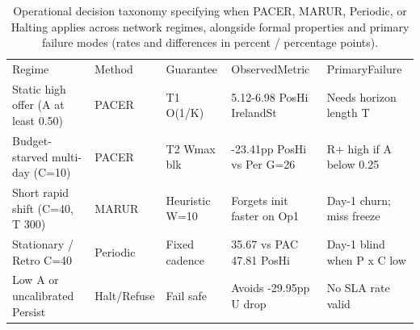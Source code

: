 \begin{table}[!ht]
\centering\footnotesize\setlength{\tabcolsep}{4pt}
\caption{Operational decision taxonomy specifying when PACER, MARUR, Periodic, or Halting applies across network regimes, alongside formal properties and primary failure modes (rates and differences in percent / percentage points).}
\begin{tabular}{lllll}
\hline
Regime & Method & Guarantee & ObservedMetric & PrimaryFailure \\
Static high offer (A at least 0.50) & PACER & T1 O(1/K) & 5.12-6.98 PosHi IrelandSt & Needs horizon length T \\
Budget-starved multi-day (C=10) & PACER & T2 Wmax blk & -23.41pp PosHi vs Per G=26 & R+ high if A below 0.25 \\
Short rapid shift (C=40, T 300) & MARUR & Heuristic W=10 & Forgets init faster on Op1 & Day-1 churn; miss freeze \\
Stationary / Retro C=40 & Periodic & Fixed cadence & 35.67 vs PAC 47.81 PosHi & Day-1 blind when P x C low \\
Low A or uncalibrated Persist & Halt/Refuse & Fail safe & Avoids -29.95pp U drop & No SLA rate valid \\
\hline
\end{tabular}
\end{table}

